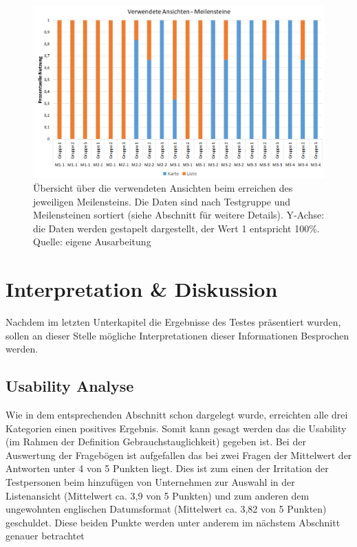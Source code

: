 \documentclass[Bachelorarbeit.tex]{subfiles}
\begin{document}
\begin{figure}[h]
\centering
\includegraphics[width=1\linewidth]{img/Evaluation/Meilenstein}
\caption[Verwendete Ansichten - Meilensteine]{
	Übersicht über die verwendeten Ansichten beim erreichen des jeweiligen Meilensteins. Die Daten sind nach Testgruppe und Meilensteinen sortiert (siehe Abschnitt  für weitere Details). Y-Achse: die Daten werden gestapelt dargestellt, der Wert 1 entspricht 100\%.
	Quelle: eigene Ausarbeitung
	}
\label{fig:Meilenstein}
\end{figure}



\section{Interpretation \& Diskussion}
\label{InterpretationDiskussion}
Nachdem im letzten Unterkapitel die Ergebnisse des Testes präsentiert wurden, sollen an dieser Stelle mögliche Interpretationen dieser Informationen Besprochen werden.

\subsection{Usability Analyse}
Wie in dem entsprechenden Abschnitt schon dargelegt wurde, erreichten alle drei Kategorien einen positives Ergebnis. 
Somit kann gesagt werden das die Usability (im Rahmen der Definition Gebrauchstauglichkeit) gegeben ist. 
Bei der Auswertung der Fragebögen ist aufgefallen das bei zwei Fragen der Mittelwert der Antworten unter 4 von 5 Punkten liegt. 
Dies ist zum einen der Irritation der Testpersonen beim hinzufügen von Unternehmen zur Auswahl in der Listenansicht (Mittelwert ca. 3,9 von 5 Punkten) und zum anderen dem ungewohnten englischen Datumsformat (Mittelwert ca. 3,82 von 5 Punkten) geschuldet.
Diese beiden Punkte werden unter anderem im nächstem Abschnitt genauer betrachtet
\end{document}
